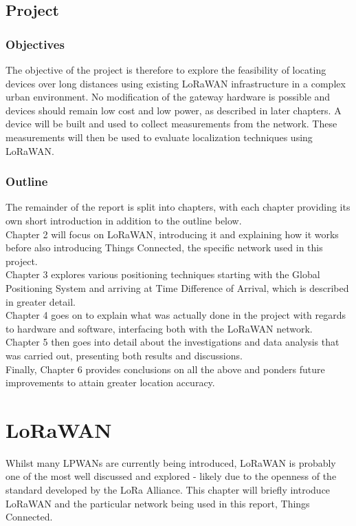 \documentclass[a4paper]{report}
\begin{document}
  \section{Project}
    \subsection{Objectives}
      The objective of the project is therefore to explore the feasibility of locating devices over long distances using existing LoRaWAN infrastructure in a complex urban environment. No modification of the gateway hardware is possible and devices should remain low cost and low power, as described in later chapters. A device will be built and used to collect measurements from the network. These measurements will then be used to evaluate localization techniques using LoRaWAN.

    \subsection{Outline}
      The remainder of the report is split into chapters, with each chapter providing its own short introduction in addition to the outline below.\\
      Chapter 2 will focus on LoRaWAN, introducing it and explaining how it works before also introducing Things Connected, the specific network used in this project.\\
      Chapter 3 explores various positioning techniques starting with the Global Positioning System and arriving at Time Difference of Arrival, which is described in greater detail.\\
      Chapter 4 goes on to explain what was actually done in the project with regards to hardware and software, interfacing both with the LoRaWAN network.\\
      Chapter 5 then goes into detail about the investigations and data analysis that was carried out, presenting both results and discussions.\\
      Finally, Chapter 6 provides conclusions on all the above and ponders future improvements to attain greater location accuracy.


\chapter{LoRaWAN}

  Whilst many LPWANs are currently being introduced, LoRaWAN is probably one of the most well discussed and explored - likely due to the openness of the standard developed by the LoRa Alliance. This chapter will briefly introduce LoRaWAN and the particular network being used in this report, Things Connected.
\end{document}
